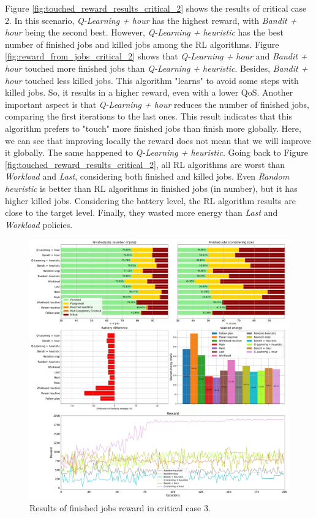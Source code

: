 Figure \ref{fig:touched_reward_results_critical_2} shows the results of critical case 2. In this scenario, \emph{Q-Learning + hour} has the highest reward, with \emph{Bandit + hour} being the second best. However, \emph{Q-Learning + heuristic} has the best number of finished jobs and killed jobs among the RL algorithms. Figure \ref{fig:reward_from_jobs_critical_2} shows that \emph{Q-Learning + hour} and \emph{Bandit + hour} touched more finished jobs than \emph{Q-Learning + heuristic}. Besides, \emph{Bandit + hour} touched less killed jobs. This algorithm "learns" to avoid some steps with killed jobs. So, it results in a higher reward, even with a lower QoS. Another important aspect is that \emph{Q-Learning + hour} reduces the number of finished jobs, comparing the first iterations to the last ones. This result indicates that this algorithm prefers to "touch" more finished jobs than finish more globally. Here, we can see that improving locally the reward does not mean that we will improve it globally. The same happened to \emph{Q-Learning + heuristic}. Going back to Figure \ref{fig:touched_reward_results_critical_2}, all RL algorithms are worst than \emph{Workload} and \emph{Last}, considering both finished and killed jobs. Even \emph{Random heuristic} is better than RL algorithms in finished jobs (in number), but it has higher killed jobs. Considering the battery level, the RL algorithm results are close to the target level. Finally, they wasted more energy than \emph{Last} and \emph{Workload} policies. 

\begin{figure}[!htb]
    \centering
    \includegraphics[scale=0.29]{Images/Learning_compensations/reward_finished_touched_profile_worst_workload_1_with_noise_state_delta.pdf}
    \caption{Results of finished jobs reward in critical case 3.}
    \label{fig:touched_reward_results_critical_3}
\end{figure}

